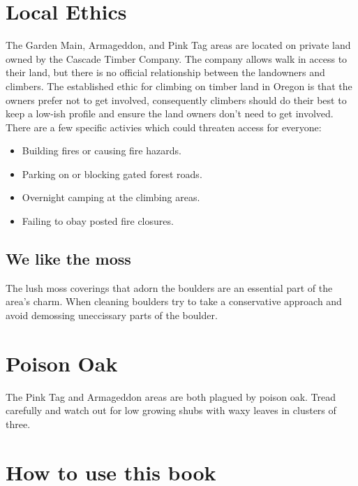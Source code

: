 \begin{multicols*}{2}
\section{Local Ethics}
The Garden Main, Armageddon, and Pink Tag areas are located on private land owned by the Cascade Timber Company. The company allows walk in access to their land, but there is no official relationship between the landowners and climbers. The established ethic for climbing on timber land in Oregon is that the owners prefer not to get involved, consequently climbers should do their best to keep a low-ish profile and ensure the land owners don't need to get involved. There are a few specific activies which could threaten access for everyone:\\
\begin{itemize}
\item Building fires or causing fire hazards.\\
\item Parking on or blocking gated forest roads.\\
\item Overnight camping at the climbing areas.\\
\item Failing to obay posted fire closures.\\
\end{itemize}
\subsection*{We like the moss}
The lush moss coverings that adorn the boulders are an essential part of the area's charm. When cleaning boulders try to take a conservative approach and avoid demossing uneccissary parts of the boulder.
\section{Poison Oak}
The Pink Tag and Armageddon areas are both plagued by poison oak. Tread carefully and watch out for low growing shubs with waxy leaves in clusters of three.
\section{How to use this book}

\end{multicols*}
